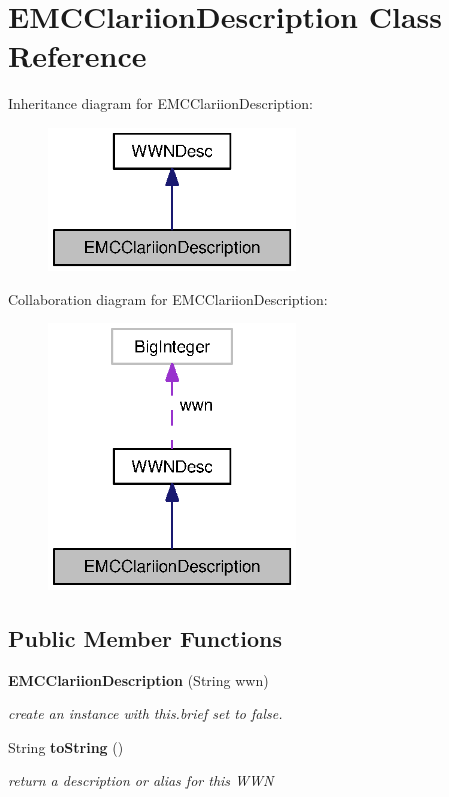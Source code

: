 \section{E\-M\-C\-Clariion\-Description Class Reference}
\label{classorg_1_1smallfoot_1_1wwn_1_1EMCClariionDescription}


Inheritance diagram for E\-M\-C\-Clariion\-Description\-:\nopagebreak
\begin{figure}[H]
\begin{center}
\leavevmode
\includegraphics[width=186pt]{classorg_1_1smallfoot_1_1wwn_1_1EMCClariionDescription__inherit__graph}
\end{center}
\end{figure}


Collaboration diagram for E\-M\-C\-Clariion\-Description\-:\nopagebreak
\begin{figure}[H]
\begin{center}
\leavevmode
\includegraphics[width=186pt]{classorg_1_1smallfoot_1_1wwn_1_1EMCClariionDescription__coll__graph}
\end{center}
\end{figure}
\subsection*{Public Member Functions}
\begin{DoxyCompactItemize}
\item 
{\bf E\-M\-C\-Clariion\-Description} (String wwn)
\begin{DoxyCompactList}\small\item\em create an instance with this.\-brief set to false. \end{DoxyCompactList}\item 
String {\bf to\-String} ()
\begin{DoxyCompactList}\small\item\em return a description or alias for this W\-W\-N \end{DoxyCompactList}\end{DoxyCompactItemize}
